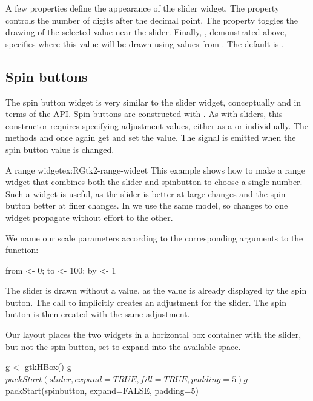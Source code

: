 A few properties define the appearance of the slider widget.  The
 property controls the number of digits after the decimal
point.  The property  toggles the drawing of the
selected value near the slider. Finally, ,
demonstrated above, specifies where this value will be drawn using
values from . The default is .

\subsection{Spin buttons}
\label{sec:RGtk2:spinboxes}

The spin button widget is very similar to the slider widget,
conceptually and in terms of the \GTK\/ API. Spin buttons are
constructed with . As with sliders, this
constructor requires specifying adjustment values, either as a
 or individually.  The methods
 and 
once again get and set the value. The 
signal is emitted when the spin button value is changed.

\begin{example}{A range widget}{ex:RGtk2-range-widget}
This example shows how to make a range widget that combines both the
slider and spinbutton to choose a single number. Such a widget is
useful, as the slider is better at large changes and the spin button
better at finer changes. In \GTK\/ we use the same
 model, so changes to one widget propagate
without effort to the other.


We name our scale parameters according to the corresponding arguments
to the  function:
\begin{Schunk}
\begin{Sinput}
 from <- 0; to <- 100; by <- 1
\end{Sinput}
\end{Schunk}

The slider is drawn without a value, as the value is already displayed
by the spin button. The call to  implicitly
creates an adjustment for the slider. The spin button is then created
with the same adjustment.
\begin{Schunk}
\end{Schunk}
%
Our layout places the two widgets in a horizontal box container with
the slider, but not the spin button, set to expand into the available
space.
\begin{Schunk}
\begin{Sinput}
 g <- gtkHBox()
 g$packStart(slider, expand=TRUE, fill=TRUE, padding=5)
 g$packStart(spinbutton, expand=FALSE, padding=5)
\end{Sinput}
\end{Schunk}


\end{example}

